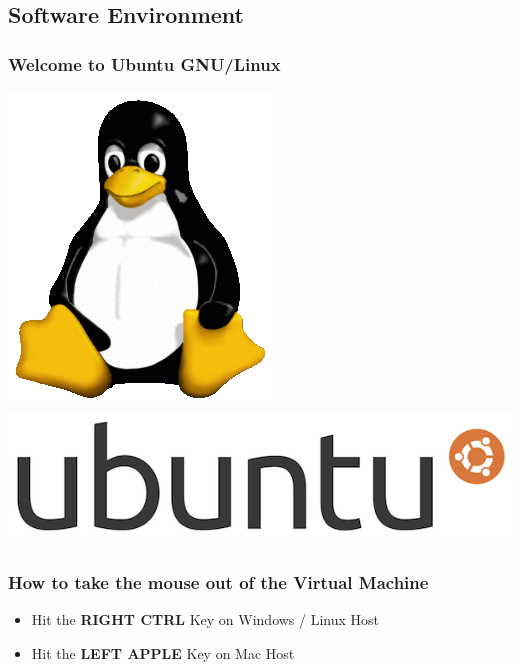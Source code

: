 \subsection{Software Environment}


{
\begin{frame}
\frametitle{Welcome to Ubuntu GNU/Linux}
\begin{center}
\includegraphics[height=0.5\paperheight]{../Art/Tux.png}
\includegraphics[width=0.5\paperwidth]{../Art/blackeubuntulogo.png}
\end{center}
\end{frame}
}

{
\begin{frame}
\frametitle{How to take the mouse out of the Virtual Machine}
\begin{itemize}
\item Hit the \textbf{RIGHT CTRL} Key on Windows / Linux Host
\item Hit the \textbf{LEFT APPLE} Key on Mac Host
\end{itemize}
\end{frame}
}

